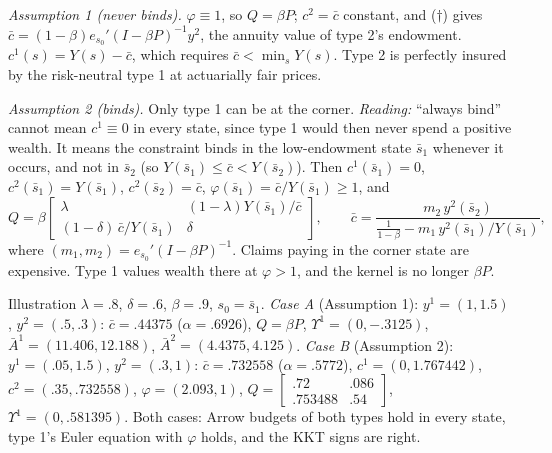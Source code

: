 \documentclass[12pt, letterpaper]{article}
\begin{document}
\begin{tcolorbox}[oddbox,title={Exercise 8.27 \quad Corners}]
\emph{Assumption 1 (never binds).} $\varphi\equiv1$, so $Q=\beta P$; $c^2=\bar c$ constant, and ($\dagger$) gives
$\bar c=(1-\beta)e_{s_0}'(I-\beta P)^{-1}y^2$, the annuity value of type 2's endowment. $c^1(s)=Y(s)-\bar c$, which requires
$\bar c<\min_sY(s)$. Type 2 is perfectly insured by the risk-neutral type 1 at actuarially fair prices.

\emph{Assumption 2 (binds).} Only type 1 can be at the corner. \emph{Reading:} ``always bind'' cannot mean
$c^1\equiv0$ in every state, since type 1 would then never spend a positive wealth. It means the constraint binds
in the low-endowment state $\bar s_1$ whenever it occurs, and not in $\bar s_2$ (so $Y(\bar s_1)\le\bar c<Y(\bar s_2)$). Then
$c^1(\bar s_1)=0$, $c^2(\bar s_1)=Y(\bar s_1)$, $c^2(\bar s_2)=\bar c$, $\varphi(\bar s_1)=\bar c/Y(\bar s_1)\ge1$, and
\[
Q=\beta\begin{bmatrix}\lambda&(1-\lambda)Y(\bar s_1)/\bar c\\(1-\delta)\,\bar c/Y(\bar s_1)&\delta\end{bmatrix},\qquad
\bar c=\frac{m_2\,y^2(\bar s_2)}{\frac{1}{1-\beta}-m_1\,y^2(\bar s_1)/Y(\bar s_1)},
\]
where $(m_1,m_2)=e_{s_0}'(I-\beta P)^{-1}$. Claims paying in the corner state are expensive. Type 1 values wealth
there at $\varphi>1$, and the kernel is no longer $\beta P$.

\begin{tcolorbox}[databox]
Illustration $\lambda=.8$, $\delta=.6$, $\beta=.9$, $s_0=\bar s_1$. \emph{Case A} (Assumption 1): $y^1=(1,1.5)$,
$y^2=(.5,.3)$: $\bar c=.44375$ ($\alpha=.6926$), $Q=\beta P$, $\Upsilon^1=(0,-.3125)$, $\bar A^1=(11.406,12.188)$,
$\bar A^2=(4.4375,4.125)$. \emph{Case B} (Assumption 2): $y^1=(.05,1.5)$, $y^2=(.3,1)$: $\bar c=.732558$
($\alpha=.5772$), $c^1=(0,1.767442)$, $c^2=(.35,.732558)$, $\varphi=(2.093,1)$,
$Q=\begin{bmatrix}.72&.086\\.753488&.54\end{bmatrix}$, $\Upsilon^1=(0,.581395)$. Both cases: Arrow budgets of both
types hold in every state, type 1's Euler equation with $\varphi$ holds, and the KKT signs are right.
\end{tcolorbox}
\end{tcolorbox}
\end{document}
